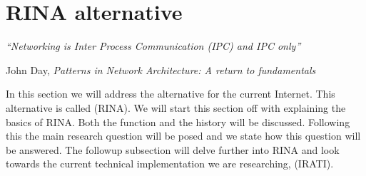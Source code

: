 \section{RINA alternative}
\label{sec:RINAalternative}
\epigraph{\emph{``Networking is Inter Process Communication (IPC) and IPC only''}}{John Day, \emph{Patterns in Network Architecture: A return to fundamentals}}

In this section we will address the alternative for the current Internet. This alternative is called  (RINA). We will start this section off with explaining the basics of RINA. Both the function and the history will be discussed. Following this the main research question will be posed and we state how this question will be answered. The followup subsection will delve further into RINA and look towards the current technical implementation we are researching,  (IRATI). 

